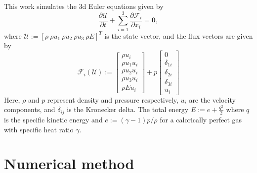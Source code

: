 \documentclass[a4paper,11pt,oneside]{article}
\newcommand{\vect}[1]{\ensuremath{\boldsymbol{\mathbf{#1}}}} %
\newcommand{\pder}[2]{\frac{\partial #1}{\partial #2}} %
\newcommand{\defeq}{\ensuremath{:=}} %
\newcommand{\eulerphy}[1]{\ensuremath{\mathcal{#1}}} %
\begin{document}
This work simulates the 3d Euler equations given by
\begin{equation*}
	\pder{\vect{\eulerphy{U}}}{t} + \sum_{i=1}^{3} \pder{\vect{\eulerphy{F}}_i}{x_i} = \vect{0},
	\label{eq:3d_euler}
\end{equation*}
where $\vect{\eulerphy{U}} \defeq \left[ \rho\ \rho u_1\ \rho u_2\ \rho u_3\ \rho E \right]^T$ is the state vector, and the flux vectors are given by
\begin{equation*}
	\vect{\eulerphy{F}}_i(\vect{\eulerphy{U}}) \defeq
	\begin{bmatrix}
		\rho u_i\\
		\rho u_1 u_i\\
		\rho u_2 u_i\\
		\rho u_3 u_i\\
		\rho E u_i
	\end{bmatrix}
	+ p
	\begin{bmatrix}
		0\\
		\delta_{1i}\\
		\delta_{2i}\\
		\delta_{3i}\\
		u_i
	\end{bmatrix}
	\label{eq:3d_euler_flux_tensor}
\end{equation*}
Here, $\rho$ and $p$ represent density and pressure respectively, $u_i$ are the velocity components, and $\delta_{ij}$ is the Kronecker delta. The total energy $E \defeq e + \frac{q^2}{2}$ where $q$ is the specific kinetic energy and $e \defeq (\gamma-1)p/\rho$ for a calorically perfect gas with specific heat ratio $\gamma$.



\section{Numerical method}
\label{sec:num_method}
\end{document}
